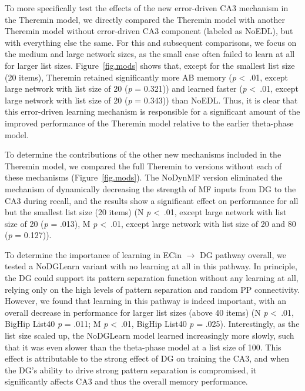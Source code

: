 \documentclass[11pt,twoside]{article}
\newif\myifpdf
\begin{document}
To more specifically test the effects of the new error-driven CA3 mechanism in the Theremin model, we directly compared the Theremin model with another Theremin model without error-driven CA3 component (labeled as NoEDL), but with everything else the same. For this and subsequent comparisons, we focus on the medium and large network sizes, as the small case often failed to learn at all for larger list sizes.  Figure~\ref{fig.mods} shows that, except for the smallest list size (20 items), Theremin retained significantly more AB memory (\emph{p} \textless \ .01, except large network with list size of 20 (\emph{p} = 0.321)) and learned faster (\emph{p} \textless \ .01, except large network with list size of 20 (\emph{p} = 0.343)) than NoEDL.  Thus, it is clear that this error-driven learning mechanism is responsible for a significant amount of the improved performance of the Theremin model relative to the earlier theta-phase model.

To determine the contributions of the other new mechanisms included in the Theremin model, we compared the full Theremin to versions without each of these mechanisms (Figure~\ref{fig.mods}).  The NoDynMF version eliminated the mechanism of dynamically decreasing the strength of MF inputs from DG to the CA3 during recall, and the results show a significant effect on performance for all but the smallest list size (20 items) (N \emph{p} \textless \ .01, except large network with list size of 20 (\emph{p} = .013), M \emph{p} \textless \ .01, except large network with list size of 20 and 80 (\emph{p} = 0.127)). 

To determine the importance of learning in ECin $\rightarrow$ DG pathway overall, we tested a NoDGLearn variant with no learning at all in this pathway.  In principle, the DG could support its pattern separation function without any learning at all, relying only on the high levels of pattern separation and random PP connectivity.  However, we found that learning in this pathway is indeed important, with an overall decrease in performance for larger list sizes (above 40 items) (N \emph{p} \textless \ .01, BigHip List40 \emph{p} = .011; M \emph{p} \textless \ .01, BigHip List40 \emph{p} = .025).  Interestingly, as the list size scaled up, the NoDGLearn model learned increasingly more slowly, such that it was even slower than the theta-phase model at a list size of 100. This effect is attributable to the strong effect of DG on training the CA3, and when the DG's ability to drive strong pattern separation is compromised, it significantly affects CA3 and thus the overall memory performance.
\end{document}
